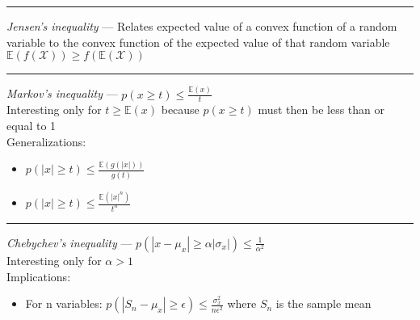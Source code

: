 {\color{lightgray}\hrule height 0.001mm}

\emph{Jensen's inequality} --- Relates expected value of a convex function of a random variable to the convex function of the expected value of that random variable\\
$\mathbb{E}(f(\mathcal{X})) \geq f(\mathbb{E}(\mathcal{X}))$

{\color{lightgray}\hrule height 0.001mm}

\emph{Markov's inequality} --- $p(x \geq t) \leq \frac{\mathbb{E}(x)}{t}$\\
Interesting only for $t \geq \mathbb{E}(x)$ because $p(x \geq t)$ must then be less than or equal to 1\\
Generalizations:
\begin{itemize}
    \item $p(|x| \geq t) \leq \frac{\mathbb{E}(g(|x|))}{g(t)}$
    \item $p(|x| \geq t) \leq \frac{\mathbb{E}(|x|^n)}{t^n}$
\end{itemize}

{\color{lightgray}\hrule height 0.001mm}

\emph{Chebychev's inequality} --- $p( |x - \mu_x| \geq \alpha | \sigma_x |) \leq \frac{1}{\alpha^2}$\\
Interesting only for $\alpha > 1$\\
Implications:
\begin{itemize}
    \item For n variables: $p( |S_n - \mu_x| \geq \epsilon) \leq \frac{\sigma_x^2}{n \epsilon^2}$ where $S_n$ is the sample mean
\end{itemize}